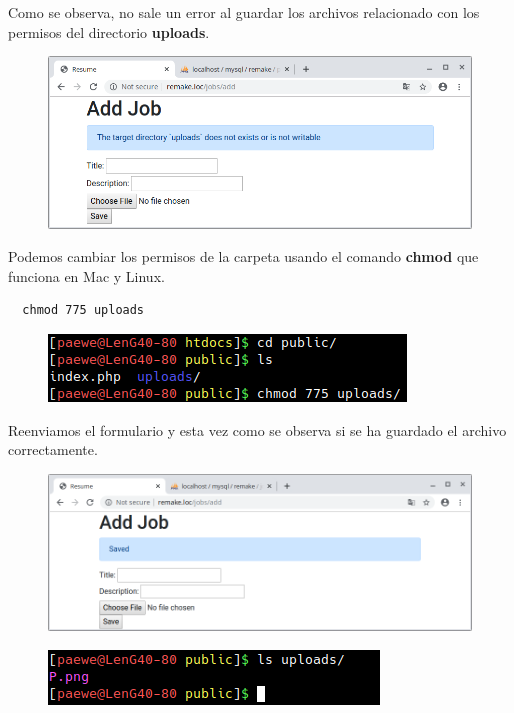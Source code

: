 \documentclass{article}
\begin{document}
Como se observa, no sale un error al guardar los archivos relacionado con los
permisos del directorio \textbf{uploads}.
\begin{figure}[h!]
  \centering
  \includegraphics[scale=0.5]{./Pictures/180_save_not_writable.png}
\end{figure}

Podemos cambiar los permisos de la carpeta usando el comando \textbf{chmod} que
funciona en Mac y Linux.\\

\begin{verbatim}
  chmod 775 uploads
\end{verbatim}

\begin{figure}[h!]
  \centering
  \includegraphics[scale=0.75]{./Pictures/182_permisos.png}
\end{figure}

Reenviamos el formulario y esta vez como se observa si se ha guardado el
archivo correctamente.
\begin{figure}[h!]
  \centering
  \includegraphics[scale=0.5]{./Pictures/181_resave.png}
\end{figure}

\begin{figure}[h!]
  \centering
  \includegraphics[scale=0.75]{./Pictures/183_fichero_updated.png}
\end{figure}
\end{document}
